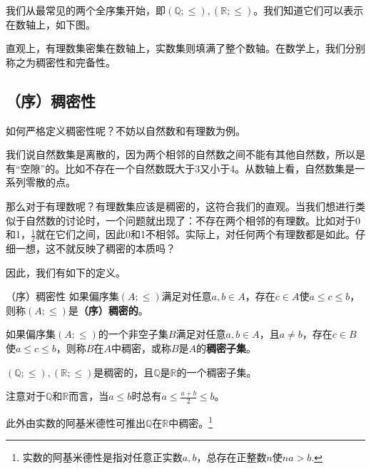 
\begin{issues}
\issueDraft
\issueTODO
\end{issues}


我们从最常见的两个全序集开始，即$(\mathbb{Q};\leq),(\mathbb{R};\leq)$。我们知道它们可以表示在数轴上，如下图。


直观上，有理数集密集在数轴上，实数集则填满了整个数轴。在数学上，我们分别称之为稠密性和完备性。

\subsection{（序）稠密性}

如何严格定义稠密性呢？不妨以自然数和有理数为例。

我们说自然数集是离散的，因为两个相邻的自然数之间不能有其他自然数，所以是有“空隙”的。比如不存在一个自然数既大于3又小于4。从数轴上看，自然数集是一系列零散的点。

那么对于有理数呢？有理数集应该是稠密的，这符合我们的直观。当我们想进行类似于自然数的讨论时，一个问题就出现了：不存在两个相邻的有理数。比如对于0和1，$\frac{1}{2}$就在它们之间，因此0和1不相邻。实际上，对任何两个有理数都是如此。仔细一想，这不就反映了稠密的本质吗？

因此，我们有如下的定义。

\begin{definition}{（序）稠密性}
如果偏序集$(A;\leq)$满足对任意$a,b\in A$，存在$c\in A$使$a\leq c\leq b$，则称$(A;\leq)$是\textbf{（序）稠密的}。

如果偏序集$(A;\leq)$的一个非空子集$B$满足对任意$a,b\in A$，且$a\neq b$，存在$c\in B$使$a\leq c\leq b$，则称$B$在$A$中稠密，或称$B$是$A$的\textbf{稠密子集}。
\end{definition}

\begin{example}{}
$(\mathbb{Q};\leq),(\mathbb{R};\leq)$是稠密的，且$\mathbb{Q}$是$\mathbb{R}$的一个稠密子集。
\end{example}

注意对于$\mathbb{Q}$和$\mathbb{R}$而言，当$a\leq b$时总有$a\leq\frac{a+b}{2}\leq b$。

此外由实数的阿基米德性可推出$\mathbb{Q}$在$\mathbb{R}$中稠密。\footnote{实数的阿基米德性是指对任意正实数$a,b$，总存在正整数$n$使$na>b$.}

